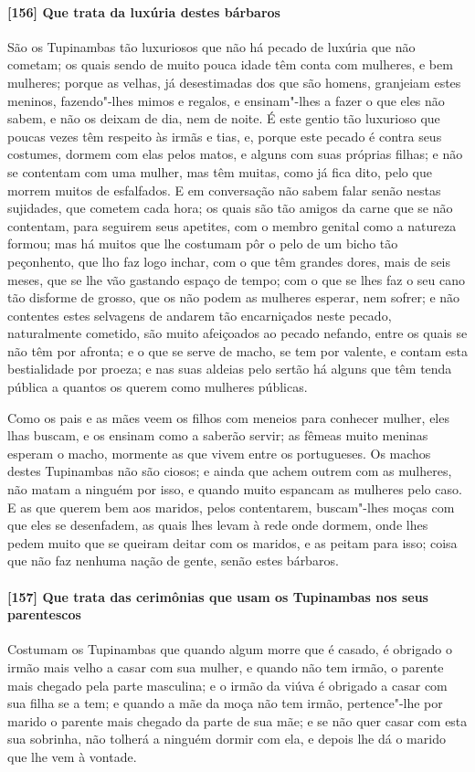 \paragraph{[156] Que trata da luxúria destes bárbaros}\quad
São os Tupinambas tão luxuriosos que não há pecado de luxúria que não cometam; os quais
sendo de muito pouca idade têm conta com mulheres, e bem mulheres; porque as velhas, já
desestimadas dos que são homens, granjeiam estes meninos, fazendo"-lhes mimos e regalos, e
ensinam"-lhes a fazer o que eles não sabem, e não os deixam de dia, nem de noite. É este
gentio tão luxurioso que poucas vezes têm respeito às irmãs e tias, e, porque este pecado
é contra seus costumes, dormem com elas pelos matos, e alguns com suas próprias filhas; e
não se contentam com uma mulher, mas têm muitas, como já fica dito, pelo que morrem muitos
de esfalfados. E em conversação não sabem falar senão nestas sujidades, que cometem cada
hora; os quais são tão amigos da carne que se não contentam, para seguirem seus apetites,
com o membro genital como a natureza formou; mas há muitos que lhe costumam pôr o pelo de
um bicho tão peçonhento, que lho faz logo inchar, com o que têm grandes dores, mais de
seis meses, que se lhe vão gastando espaço de tempo; com o que se lhes faz o seu cano tão
disforme de grosso, que os não podem as mulheres esperar, nem sofrer; e não contentes
estes selvagens de andarem tão encarniçados neste pecado, naturalmente cometido, são muito
afeiçoados ao pecado nefando, entre os quais se não têm por afronta; e o que se serve de
macho, se tem por valente, e contam esta bestialidade por proeza; e nas suas aldeias pelo
sertão há alguns que têm tenda pública a quantos os querem como mulheres públicas.

Como os pais e as mães veem os filhos com meneios para conhecer mulher, eles lhas buscam,
e os ensinam como a saberão servir; as fêmeas muito meninas esperam o macho, mormente as
que vivem entre os portugueses. Os machos destes Tupinambas não são ciosos; e ainda que
achem outrem com as mulheres, não matam a ninguém por isso, e quando muito espancam as
mulheres pelo caso. E as que querem bem aos maridos, pelos contentarem, buscam"-lhes moças
com que eles se desenfadem, as quais lhes levam à rede onde dormem, onde lhes pedem muito
que se queiram deitar com os maridos, e as peitam para isso; coisa que não faz nenhuma
nação de gente, senão estes bárbaros.

\paragraph{[157] Que trata das cerimônias que usam os Tupinambas nos seus parentescos}\quad
Costumam os Tupinambas que quando algum morre que é casado, é obrigado o irmão mais velho
a casar com sua mulher, e quando não tem irmão, o parente mais chegado pela parte
masculina; e o irmão da viúva é obrigado a casar com sua filha se a tem; e quando a mãe da
moça não tem irmão, pertence"-lhe por marido o parente mais chegado da parte de sua mãe; e
se não quer casar com esta sua sobrinha, não tolherá a ninguém dormir com ela, e depois
lhe dá o marido que lhe vem à vontade.

